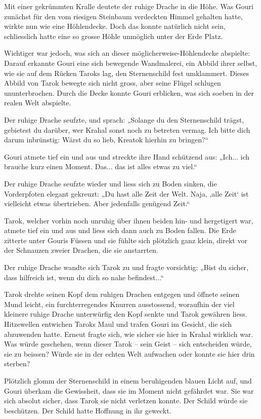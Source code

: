 Mit einer gekrümmten Kralle deutete der ruhige Drache in die Höhe. Was Gouri zunächst für den vom riesigen Steinbaum verdeckten Himmel gehalten hatte, wirkte nun wie eine Höhlendecke. Doch das konnte natürlich nicht sein, schliesslich hatte eine so grosse Höhle unmöglich unter der Erde Platz.

Wichtiger war jedoch, was sich an dieser möglicherweise-Höhlendecke abspielte: Darauf erkannte Gouri eine sich bewegende Wandmalerei, ein Abbild ihrer selbst, wie sie auf dem Rücken Taroks lag, den Sternenschild fest umklammert. Dieses Abbild von Tarok bewegte sich nicht gross, aber seine Flügel schlugen ununterbrochen. Durch die Decke konnte Gouri erblicken, was sich soeben in der realen Welt abspielte.

Der ruhige Drache seufzte, und sprach: „Solange du den Sternenschild trägst, gebietest du darüber, wer Krahal sonst noch zu betreten vermag. Ich bitte dich darum inbrünstig: Wärst du so lieb, Kreatok hierhin zu bringen?“

Gouri atmete tief ein und aus und streckte ihre Hand schützend aus: „Ich... ich brauche kurz einen Moment. Das... das ist alles etwas zu viel.“

Der ruhige Drache seufzte wieder und liess sich zu Boden sinken, die Vorderpfoten elegant gekreuzt: „Du hast alle Zeit der Welt. Naja, ‚alle Zeit‘ ist vielleicht etwas übertrieben. Aber jedenfalls genügend Zeit.“

Tarok, welcher vorhin noch unruhig über ihnen beiden hin- und hergetigert war, atmete tief ein und aus und liess sich dann auch zu Boden fallen. Die Erde zitterte unter Gouris Füssen und sie fühlte sich plötzlich ganz klein, direkt vor der Schnauzen zweier Drachen, die sie anstarrten.

Der ruhige Drache wandte sich Tarok zu und fragte vorsichtig: „Bist du sicher, dass hilfreich ist, wenn du dich so nahe befindest...“

Tarok drehte seinen Kopf dem ruhigen Drachen entgegen und öffnete seinen Mund leicht, ein furchterregendes Knurren ausstossend, woraufhin der viel kleinere ruhige Drache unterwürfig den Kopf senkte und Tarok gewähren liess. Hitzewellen entwichen Taroks Maul und trafen Gouri im Gesicht, die sich abzuwenden hatte. Erneut fragte sich, wie sicher sie hier in Krahal wirklich war. Was würde geschehen, wenn dieser Tarok – sein Geist – sich entscheiden würde, sie zu beissen? Würde sie in der echten Welt aufwachen oder konnte sie hier drin sterben?

Plötzlich glomm der Sternenschild in einem beruhigenden blauen Licht auf, und Gouri überkam die Gewissheit, dass sie im Moment nicht gefährdet war. Sie war sich absolut sicher, dass Tarok sie nicht verletzen konnte. Der Schild würde sie beschützen. Der Schild hatte Hoffnung in ihr geweckt.

